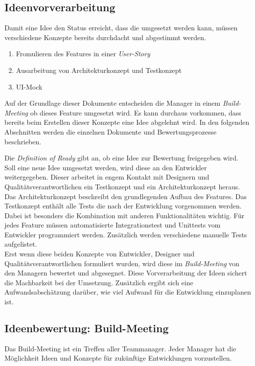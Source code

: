 \subsection{Ideenvorverarbeitung}
Damit eine Idee den Status erreicht, dass die umgesetzt werden kann, müssen verschiedene Konzepte bereits durchdacht und abgestimmt werden. 
\begin{enumerate}
    \item Fromulieren des Features in einer \textit{User-Story}
    \item Ausarbeitung von Architekturkonzept und Testkonzept
    \item UI-Mock
\end{enumerate}
Auf der Grundlage dieser Dokumente entscheiden die Manager in einem \textit{Build-Meeting} ob dieses Feature 
umgesetzt wird. Es kann durchaus vorkommen, dass bereits beim Erstellen dieser Konzepte eine Idee abgelehnt wird. In den folgenden Abschnitten werden
die einzelnen Dokumente und Bewertungsprozesse beschrieben.

Die \textit{Definition of Ready} gibt an, ob eine Idee zur Bewertung freigegeben wird.
Soll eine neue Idee umgesetzt werden, wird diese an den Entwickler weitergegeben. Dieser 
arbeitet in engem Kontakt mit Designern und Qualitätsverantwortlichen ein Testkonzept und ein Architekturkonzept heraus. 
Das Architekturkonzept beschreibt den grundlegenden Aufbau des Features. 
Das Testkonzept enthält alle Tests die nach der Entwicklung vorgenommen werden. Dabei ist besonders die Kombination mit anderen Funktionalitäten 
wichtig. Für jedes Feature müssen automatisierte Integrationstest und Unittests vom Entwickler programmiert werden. Zusätzlich werden verschiedene
manuelle Tests aufgelistet.\\
Erst wenn diese beiden Konzepte von Entwickler, Designer und Qualitätsverantwortlichen formuliert wurden, wird diese im 
\textit{Build-Meeting} von den Managern bewertet und abgesegnet. Diese Vorverarbeitung der Ideen sichert die Machbarkeit bei der Umsetzung. Zusätzlich ergibt 
sich eine Aufwandsabschätzung darüber, wie viel Aufwand für die Entwicklung einzuplanen ist. 

\subsection{Ideenbewertung: Build-Meeting}
Das Build-Meeting ist ein Treffen aller Teammanager. Jeder Manager hat die Möglichkeit Ideen und Konzepte für zukünftige Entwicklungen 
vorzustellen. 

